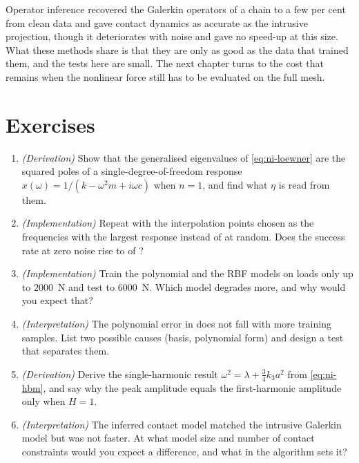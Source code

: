 Operator inference recovered the Galerkin operators of a chain to a few per cent from clean data and gave contact dynamics as accurate as the intrusive projection, though it deteriorates with noise and gave no speed-up at this size. What these methods share is that they are only as good as the data that trained them, and the tests here are small. The next chapter turns to the cost that remains when the nonlinear force still has to be evaluated on the full mesh.

\section*{Exercises}\label{sec:ni-exercises}
\begin{enumerate}
\item \emph{(Derivation)} Show that the generalised eigenvalues of \eqref{eq:ni-loewner} are the squared poles of a single-degree-of-freedom response $x(\omega)=1/(k-\omega^2m+i\omega c)$ when $n=1$, and find what $\eta$ is read from them.
\item \emph{(Implementation)} Repeat  with the interpolation points chosen as the frequencies with the largest response instead of at random. Does the success rate at zero noise rise to \cldNDraw{} of \cldNDraw{}?
\item \emph{(Implementation)} Train the polynomial and the RBF models on loads only up to $2000$~N and test to $6000$~N. Which model degrades more, and why would you expect that?
\item \emph{(Interpretation)} The polynomial error in  does not fall with more training samples. List two possible causes (basis, polynomial form) and design a test that separates them.
\item \emph{(Derivation)} Derive the single-harmonic result $\omega^2=\lambda+\tfrac34k_3a^2$ from \eqref{eq:ni-hbm}, and say why the peak amplitude equals the first-harmonic amplitude only when $H=1$.
\item \emph{(Interpretation)} The inferred contact model matched the intrusive Galerkin model but was not faster. At what model size and number of contact constraints would you expect a difference, and what in the algorithm sets it?
\end{enumerate}

\chapterrefs
